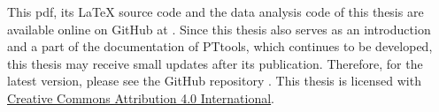 This pdf, its LaTeX source code and the data analysis code of this thesis are available online on GitHub at \cite{thesis_source}.
Since this thesis also serves as an introduction and a part of the documentation of PTtools,
which continues to be developed,
this thesis may receive small updates after its publication.
Therefore, for the latest version, please see the GitHub repository \cite{thesis_source}.
This thesis is licensed with
\href{https://creativecommons.org/licenses/by/4.0/}{Creative Commons Attribution 4.0 International}.
